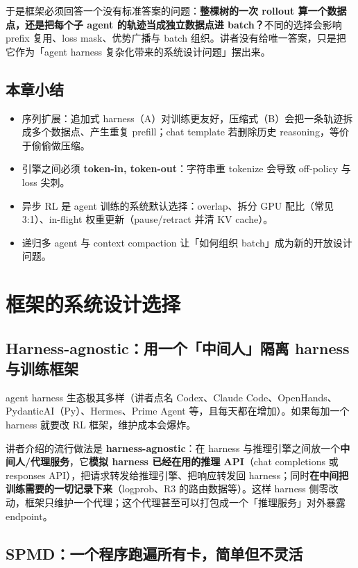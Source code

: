 \documentclass[a4paper]{article}
\begin{document}
于是框架必须回答一个没有标准答案的问题：\textbf{整棵树的一次 rollout 算一个数据点，还是把每个子 agent 的轨迹当成独立数据点进 batch？}不同的选择会影响 prefix 复用、loss mask、优势广播与 batch 组织。讲者没有给唯一答案，只是把它作为「agent harness 复杂化带来的系统设计问题」摆出来。

\subsection{本章小结}

\begin{itemize}
\item 序列扩展：追加式 harness（A）对训练更友好，压缩式（B）会把一条轨迹拆成多个数据点、产生重复 prefill；chat template 若删除历史 reasoning，等价于偷偷做压缩。
\item 引擎之间必须 \textbf{token-in, token-out}：字符串重 tokenize 会导致 off-policy 与 loss 尖刺。
\item 异步 RL 是 agent 训练的系统默认选择：overlap、拆分 GPU 配比（常见 3:1）、in-flight 权重更新（pause/retract 并清 KV cache）。
\item 递归多 agent 与 context compaction 让「如何组织 batch」成为新的开放设计问题。
\end{itemize}

\section{框架的系统设计选择}

\subsection{Harness-agnostic：用一个「中间人」隔离 harness 与训练框架}

agent harness 生态极其多样（讲者点名 Codex、Claude Code、OpenHands、PydanticAI（Py）、Hermes、Prime Agent 等，且每天都在增加）。如果每加一个 harness 就要改 RL 框架，维护成本会爆炸。

讲者介绍的流行做法是 \textbf{harness-agnostic}：在 harness 与推理引擎之间放一个\textbf{中间人/代理服务}，它\textbf{模拟 harness 已经在用的推理 API}（chat completions 或 responses API），把请求转发给推理引擎、把响应转发回 harness；同时\textbf{在中间把训练需要的一切记录下来}（logprob、R3 的路由数据等）。这样 harness 侧零改动，框架只维护一个代理；这个代理甚至可以打包成一个「推理服务」对外暴露 endpoint。

\subsection{SPMD：一个程序跑遍所有卡，简单但不灵活}
\end{document}
